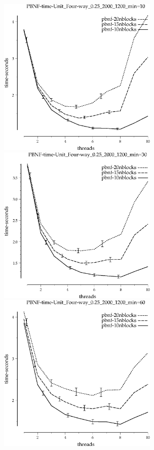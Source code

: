 \documentclass{article}
\begin{document}
\begin{figure}[t]
\begin{center}
\includegraphics[width=3in]{grid_unit_four-way_0.25_2000_1200/PBNF-time-Unit_Four-way_0.25_2000_1200_min=10.eps}
\includegraphics[width=3in]{grid_unit_four-way_0.25_2000_1200/PBNF-time-Unit_Four-way_0.25_2000_1200_min=30.eps}
\includegraphics[width=3in]{grid_unit_four-way_0.25_2000_1200/PBNF-time-Unit_Four-way_0.25_2000_1200_min=60.eps}

\end{center}
\end{figure}
\end{document}
